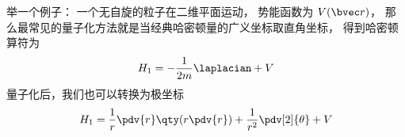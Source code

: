 
举一个例子： 一个无自旋的粒子在二维平面运动， 势能函数为 $V(\bvec r)$， 那么最常见的量子化方法就是当经典哈密顿量的广义坐标取直角坐标， 得到哈密顿算符为
\begin{equation}
H_1 = -\frac{1}{2m} \laplacian + V
\end{equation}
量子化后，我们也可以转换为极坐标
\begin{equation}
H_1 = \frac{1}{r}\pdv{r}\qty(r \pdv{r}) + \frac{1}{r^2} \pdv[2]{\theta} + V
\end{equation}
